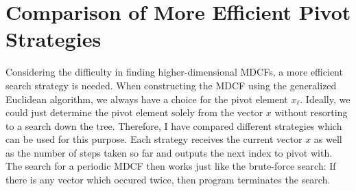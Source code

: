 


\section{Comparison of More Efficient Pivot Strategies}

Considering the difficulty in finding higher-dimensional MDCFs,
a more efficient search strategy is needed.
When constructing the MDCF using the generalized Euclidean algorithm,
we always have a choice for the pivot element $x_ℓ$.
Ideally, we could just determine the pivot element solely from the vector $x$
without resorting to a search down the tree.
Therefore, I have compared different strategies which can be used for this purpose.
Each strategy receives the current vector $x$ as well as the number of steps
taken so far and outputs the next index to pivot with.
The search for a periodic MDCF then works just like the brute-force search:
If there is any vector which occured twice, then program terminates the search.

